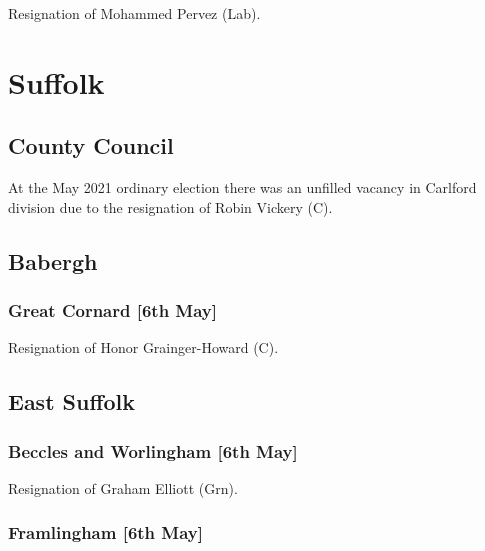 \documentclass[a4paper,openany]{book}
\begin{document}
\begin{resultsiii}

Resignation of Mohammed Pervez (Lab).

\section{Suffolk}

\subsection*{County Council}

At the May 2021 ordinary election there was an unfilled vacancy in Carlford division due to the resignation of Robin Vickery (C).

\subsection*{Babergh}

\subsubsection*{Great Cornard \hspace*{\fill}\nolinebreak[1]%
	\enspace\hspace*{\fill}
	[6th May]}


Resignation of Honor Grainger-Howard (C).

\subsection*{East Suffolk}

\subsubsection*{Beccles and Worlingham \hspace*{\fill}\nolinebreak[1]%
	\enspace\hspace*{\fill}
	[6th May]}


Resignation of Graham Elliott (Grn).

\subsubsection*{Framlingham \hspace*{\fill}\nolinebreak[1]%
	\enspace\hspace*{\fill}
	[6th May]}


\end{resultsiii}
\end{document}
